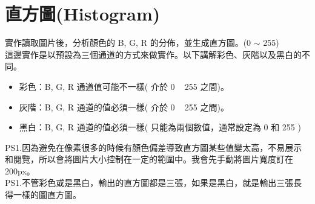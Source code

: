 \documentclass[12pt,a4paper]{article}
\begin{document}
\section{直方圖(Histogram)}
\begin{minipage}{\textwidth} 
    實作讀取圖片後，分析顏色的 B, G, R 的分佈，並生成直方圖。(0 $\sim$ 255) \\
    這邊實作是以預設為三個通道的方式來做實作。以下講解彩色、灰階以及黑白的不同。
    \begin{itemize}
        \item 彩色：B, G, R 通道值可能不一樣( 介於 0 ~ 255 之間)。
        \item 灰階：B, G, R 通道的值必須一樣( 介於 0 ~ 255 之間)。
        \item 黑白：B, G, R 通道的值必須一樣( 只能為兩個數值，通常設定為 0 和 255 )
    \end{itemize}
    PS1.因為避免在像素很多的時候有顏色偏差導致直方圖某些值變太高，不易展示和閱覽，所以會將圖片大小控制在一定的範圍中。我會先手動將圖片寬度訂在 200px。 \\[1.4pt]
    PS1.不管彩色或是黑白，輸出的直方圖都是三張，如果是黑白，就是輸出三張長得一樣的圖直方圖。
\end{minipage}
\end{document}
